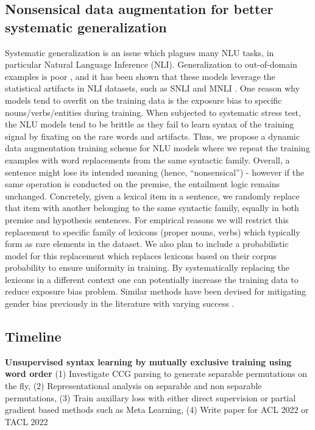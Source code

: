 \documentclass[12pt]{article}
\begin{document}

\subsection{Nonsensical data augmentation for better systematic generalization}

Systematic generalization is an issue which plagues many NLU tasks, in particular Natural Language Inference (NLI). Generalization to out-of-domain examples is poor \cite{nie2020}, and it has been shown that these models leverage the statistical artifacts in NLI datasets, such as SNLI and MNLI \cite{gururangan2018a}. One reason why models tend to overfit on the training data is the exposure bias to specific nouns/verbs/entities during training. When subjected to systematic stress test, the NLU models tend to be brittle as they fail to learn syntax of the training signal by fixating on the rare words and artifacts. Thus, we propose a dynamic data augmentation training scheme for NLU models where we repeat the training examples with word replacements from the same syntactic family. Overall, a sentence might lose its intended meaning (hence, ``nonsensical'') - however if the same operation is conducted on the premise, the entailment logic remains unchanged. Concretely, given a lexical item in a sentence, we randomly replace that item with another belonging to the same syntactic family, equally in both premise and hypothesis sentences. For empirical reasons we will restrict this replacement to specific family of lexicons (proper nouns, verbs) which typically form as rare elements in the dataset. We also plan to include a probabilistic model for this replacement which replaces lexicons based on their corpus probability to ensure uniformity in training. By systematically replacing the lexicons in a different context one can potentially increase the training data to reduce exposure bias problem. Similar methods have been devised for mitigating gender bias previously in the literature with varying success \cite{maudslay2020b}.

\subsection{Timeline}

\noindent \textbf{Unsupervised syntax learning by mutually exclusive training using word order} (1) Investigate CCG parsing to generate separable permutations on the fly, (2) Representational analysis on separable and non separable permutations, (3) Train auxillary loss with either direct supervision or partial gradient based methods such as Meta Learning, (4) Write paper for ACL 2022 or TACL 2022
\end{document}
